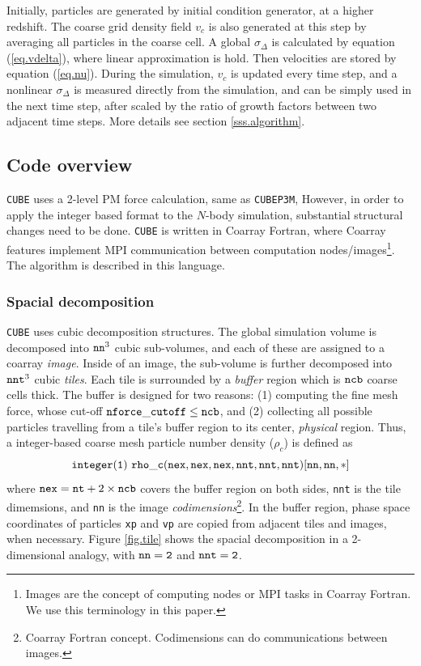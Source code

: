 \documentclass[10pt,twocolumn,preprint]{emulateapj}
\begin{document}
Initially, particles are generated by initial condition generator, at a higher redshift. The coarse grid density field $v_c$ is also generated at this step by averaging all particles in the coarse cell. A global $\sigma_\Delta$ is calculated by equation (\ref{eq.vdelta}), where linear approximation is hold. Then velocities are stored by equation (\ref{eq.nu}). During the simulation, $v_c$ is updated every time step, and a nonlinear $\sigma_\Delta$ is measured directly from the simulation, and can be simply used in the next time step, after scaled by the ratio of growth factors between two adjacent time steps. More details see section \ref{sss.algorithm}.

\subsection{Code overview}\label{ss.overview}
{\tt CUBE} uses a 2-level PM force calculation, same as {\tt CUBEP3M}, However, in order to apply the integer based format to the $N$-body simulation, substantial structural changes need to be done. {\tt CUBE} is written in Coarray Fortran, where Coarray features implement MPI communication between computation nodes/images\footnote{Images are the concept of computing nodes or MPI tasks in Coarray Fortran. We use this terminology in this paper.}.
The algorithm is described in this language. 

\subsubsection{Spacial decomposition}\label{sss.spatial_decomposition}
{\tt CUBE} uses cubic decomposition structures. The global simulation volume is decomposed into ${\tt nn}^3$ cubic sub-volumes, and each of these are assigned to a coarray {\it image}. Inside of an image, the sub-volume is further decomposed into ${\tt nnt}^3$ cubic {\it tiles}. Each tile is surrounded by a {\it buffer} region which is ${\tt ncb}$ coarse cells thick. The buffer is designed for two reasons: (1) computing the fine mesh force, whose cut-off ${\tt nforce\_cutoff}\leq{\tt ncb}$, and (2) collecting all possible particles travelling from a tile's buffer region to its center, {\it physical} region. Thus, a integer-based coarse mesh particle number density ($\rho_c$) is defined as
\begin{equation*}
{\tt integer(1)\ rho\_c(nex,nex,nex,nnt,nnt,nnt)[nn,nn,*]}\\
\end{equation*}
where ${\tt nex}={\tt nt}+2\times{\tt ncb}$ covers the buffer region on both sides, {\tt nnt} is the tile dimemsions, and {\tt nn} is the image {\it codimensions}\footnote{Coarray Fortran concept. Codimensions can do communications between images.}. In the buffer region, phase space coordinates of particles {\tt xp} and {\tt vp} are copied from adjacent tiles and images, when necessary. Figure \ref{fig.tile} shows the spacial decomposition in a 2-dimensional analogy, with ${\tt nn=2}$ and ${\tt nnt=2}$.
\end{document}
